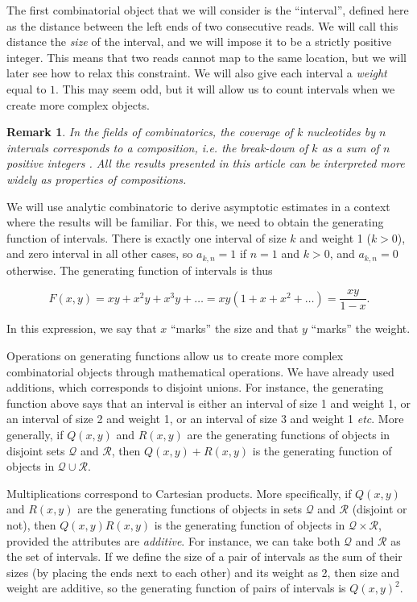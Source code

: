 \documentclass{article}
\newtheorem*{remark}{Remark}
\begin{document}
The first combinatorial object that we will consider is the ``interval'',
defined here as the distance between the left ends of two consecutive
reads. We will call this distance the \emph{size} of the interval, and we
will impose it to be a strictly positive integer. This means that two
reads cannot map to the same location, but we will later see how to relax
this constraint. We will also give each interval a \emph{weight} equal to
$1$. This may seem odd, but it will allow us to count intervals when we
create more complex objects.

\begin{remark}
In the fields of combinatorics, the coverage of $k$ nucleotides by $n$
intervals corresponds to a composition, \textit{i.e.} the break-down of
$k$ as a sum of $n$ positive integers \cite{AnalComb2009}. All the results
presented in this article can be interpreted more widely as properties of
compositions.
\end{remark}

We will use analytic combinatoric to derive asymptotic estimates in a
context where the results will be familiar. For this, we need to obtain
the generating function of intervals. There is exactly one interval of
size $k$ and weight 1 ($k > 0$), and zero interval in all other cases, so
$a_{k,n} = 1$ if $n = 1$ and $k > 0$, and $a_{k,n} = 0$ otherwise. The
generating function of intervals is thus

\begin{equation}
\label{eq:F}
F(x,y) = xy + x^2y + x^3y + \ldots
= xy(1+x+x^2+\ldots) = \frac{xy}{1-x}.
\end{equation}

In this expression, we say that $x$ ``marks'' the size and that $y$
``marks'' the weight.

Operations on generating functions allow us to create more complex
combinatorial objects through mathematical operations.  We have already
used additions, which corresponds to disjoint unions. For instance, the
generating function above says that an interval is either an interval of
size 1 and weight 1, or an interval of size 2 and weight 1, or an interval
of size 3 and weight 1 \textit{etc}. More generally, if $Q(x,y)$ and
$R(x,y)$ are the generating functions of objects in disjoint sets
$\mathcal{Q}$ and $\mathcal{R}$, then $Q(x,y)+R(x,y)$ is the generating
function of objects in $\mathcal{Q} \cup \mathcal{R}$.

Multiplications correspond to Cartesian products. More specifically, if
$Q(x,y)$ and $R(x,y)$ are the generating functions of objects in sets
$\mathcal{Q}$ and $\mathcal{R}$ (disjoint or not), then $Q(x,y)R(x,y)$ is
the generating function of objects in $\mathcal{Q} \times \mathcal{R}$,
provided the attributes are \emph{additive}. For instance, we can take
both $\mathcal{Q}$ and $\mathcal{R}$ as the set of intervals. If we define
the size of a pair of intervals as the sum of their sizes (by placing the
ends next to each other) and its weight as 2, then size and weight are
additive, so the generating function of pairs of intervals is $Q(x,y)^2$.
\end{document}
